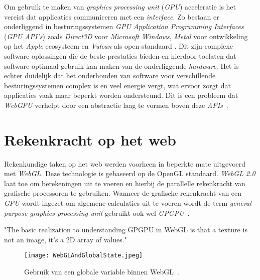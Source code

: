 Om gebruik te maken van \textit{graphics processing unit} (\textit{GPU}) acceleratie is het vereist dat applicaties communiceren met een \textit{interface}. Zo bestaan er onderliggend in besturingssystemen \textit{GPU Application Programming Interfaces} (\textit{GPU API's}) zoals \textit{Direct3D} voor \textit{Microsoft Windows}, \textit{Metal} voor ontwikkeling op het \textit{Apple} ecosysteem en \textit{Vulcan} als open standaard \autocite{Nguyen2022}. Dit zijn complexe software oplossingen die de beste prestaties bieden en hierdoor toelaten dat software optimaal gebruik kan maken van de onderliggende \textit{hardware}. Het is echter duidelijk dat het onderhouden van software voor verschillende besturingssystemen complex is en veel energie vergt, wat ervoor zorgt dat applicaties vaak maar beperkt worden ondersteund. Dit is een probleem dat \textit{WebGPU} verhelpt door een abstractie laag te vormen boven deze \textit{APIs}~\autocite{Wallez2023}.

\section{Rekenkracht op het web}
\label{sec:PowerOnWeb}

Rekenkundige taken op het web werden voorheen in beperkte mate uitgevoerd met \textit{WebGL}. Deze technologie is gebaseerd op de OpenGL standaard. \textit{WebGL 2.0} laat toe om berekeningen uit te voeren en hierbij de parallelle rekenkracht van grafische processoren te gebruiken. Wanneer de grafische rekenkracht van een \textit{GPU} wordt ingezet om algemene calculaties uit te voeren wordt de term \textit{general purpose graphics processing unit} gebruikt ook wel \textit{GPGPU}~\autocite{Skrbina2012}.

\begin{displayquote}
    "The basic realization to understanding GPGPU in WebGL is that a texture is not an image, it's a 2D array of values."
\end{displayquote}

\begin{figure}
    \texttt{[image: WebGLAndGlobalState.jpeg]}
    \caption[De \textit{Global State} in \textit{WebGL}~\autocite{GFXFundamentals2024}]{Gebruik van een globale variable binnen WebGL~\autocite{GFXFundamentals2024}.}
    \label{fig:WebGL Global State}
\end{figure}

